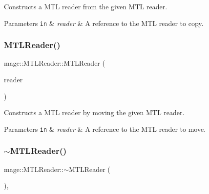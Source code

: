 Constructs a M\+TL reader from the given M\+TL reader.


\begin{DoxyParams}[1]{Parameters}
\mbox{\tt in}  & {\em reader} & A reference to the M\+TL reader to copy. \\
\hline
\end{DoxyParams}
\hypertarget{classmage_1_1_m_t_l_reader_a415057f591e54e91658c77092b7b2d4e}{}\label{classmage_1_1_m_t_l_reader_a415057f591e54e91658c77092b7b2d4e} 
\subsubsection{\texorpdfstring{M\+T\+L\+Reader()}{MTLReader()}\hspace{0.1cm}{\footnotesize\ttfamily [3/3]}}
{\footnotesize\ttfamily mage\+::\+M\+T\+L\+Reader\+::\+M\+T\+L\+Reader (\begin{DoxyParamCaption}\item[{\hyperlink{classmage_1_1_m_t_l_reader}{M\+T\+L\+Reader} \&\&}]{reader }\end{DoxyParamCaption})\hspace{0.3cm}{\ttfamily [default]}}

Constructs a M\+TL reader by moving the given M\+TL reader.


\begin{DoxyParams}[1]{Parameters}
\mbox{\tt in}  & {\em reader} & A reference to the M\+TL reader to move. \\
\hline
\end{DoxyParams}
\hypertarget{classmage_1_1_m_t_l_reader_a9d3216b2637bc9402d37c7438860f542}{}\label{classmage_1_1_m_t_l_reader_a9d3216b2637bc9402d37c7438860f542} 
\subsubsection{\texorpdfstring{$\sim$\+M\+T\+L\+Reader()}{~MTLReader()}}
{\footnotesize\ttfamily mage\+::\+M\+T\+L\+Reader\+::$\sim$\+M\+T\+L\+Reader (\begin{DoxyParamCaption}{ }\end{DoxyParamCaption})\hspace{0.3cm}{\ttfamily [virtual]}, {\ttfamily [default]}}

